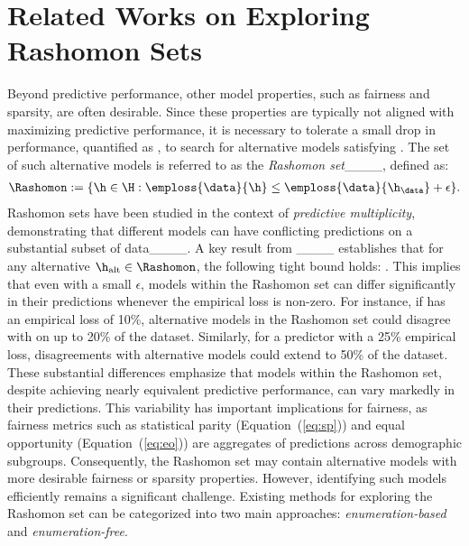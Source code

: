 \section{Related Works on Exploring Rashomon Sets}
\label{sec:related_works}

Beyond predictive performance, other model properties, such as fairness and sparsity, are often desirable. Since these properties are typically not aligned with maximizing predictive performance, it is necessary to tolerate a small drop in performance, quantified as \smash{$\epsilon$}, to search for alternative models  satisfying .  The set of such alternative models is referred to as the \emph{Rashomon set}____, defined as:
\begin{align}
    \Rashomon := \{\h\in \H : \emploss{\data}{\h}\leq \emploss{\data}{\h_{\data}}+\epsilon\}.
\end{align}
Rashomon sets have been studied in the context of \emph{predictive multiplicity}, demonstrating that 
different models can have conflicting predictions on a substantial subset of data____. 
A key result from ____ establishes that for any alternative $\h_{\text{alt}}\in \Rashomon$, the following tight bound holds:
.
This implies that even with a small $\epsilon$, models within the Rashomon set can differ significantly in their predictions whenever the empirical loss \smash{$\emploss{\data}{\h_{\data}}$} is non-zero. For instance, if \smash{$\h_{\data}$} has an empirical loss of 10\%, alternative models in the Rashomon set could disagree with \smash{$\h_{\data}$} on up to 20\% of the dataset. Similarly, for a predictor \smash{$\h_{\data}$} with a 25\% empirical loss, disagreements with alternative models could extend to 50\% of the dataset. These substantial differences emphasize that models within the Rashomon set, despite achieving nearly equivalent predictive performance, can vary markedly in their predictions. This variability has important implications for fairness, as fairness metrics such as statistical parity (Equation~(\ref{eq:sp})) and equal opportunity (Equation~(\ref{eq:eo})) are aggregates of predictions across demographic subgroups. Consequently, the Rashomon set may contain alternative models with more desirable fairness or sparsity properties. However, identifying such models efficiently remains a significant challenge. Existing methods for exploring the Rashomon set can be categorized into two main approaches: \emph{enumeration-based} and \emph{enumeration-free}.

